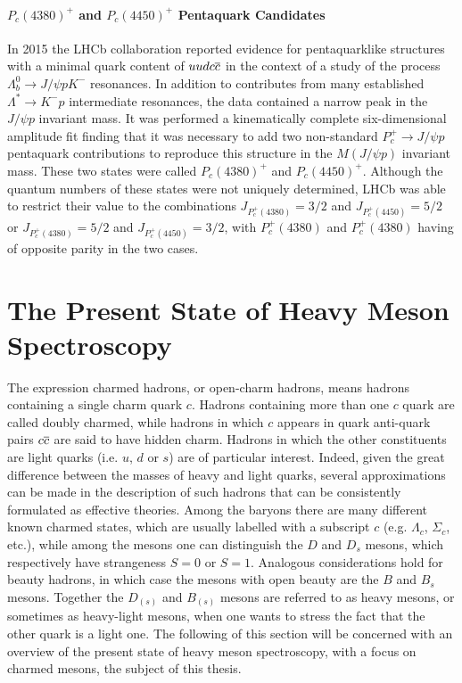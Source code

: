 \paragraph{$P_c(4380)^+$ and $P_c(4450)^+$ Pentaquark Candidates} In 2015 the LHCb collaboration reported evidence for pentaquarklike structures with a minimal quark content of $uudc\overline{c}$ in the context of a study of the process $\Lambda^0_b \to J/\psi p K^-$ resonances. In addition to contributes from many established $\Lambda^* \to K^- p$ intermediate resonances, the data contained a narrow peak in the $J/\psi p$ invariant mass. It was performed a kinematically complete six-dimensional amplitude fit finding that it was necessary to add two non-standard $P_c^+ \to J/\psi p$ pentaquark contributions to reproduce this structure in the $M(J/\psi p)$ invariant mass. These two states were called $P_c(4380)^+$ and $P_c(4450)^+$. Although the quantum numbers of these states were not uniquely determined, LHCb was able to restrict their value to the combinations $J_{P_c^+(4380)} = 3/2$ and $J_{P_c^+(4450)} = 5/2$ or $J_{P_c^+(4380)} = 5/2$ and $J_{P_c^+(4450)} = 3/2$, with $P_c^+(4380)$ and $P_c^+(4380)$ having of opposite parity in the two cases.

\section{The Present State of Heavy Meson Spectroscopy}

The expression charmed hadrons, or open-charm hadrons, means hadrons containing a single charm quark $c$. Hadrons containing more than one $c$ quark are called doubly charmed, while hadrons in which $c$ appears in quark anti-quark pairs $c \overline{c}$ are said to have hidden charm. Hadrons in which the other constituents are light quarks (i.e. $u$, $d$ or $s$) are of particular interest. Indeed, given the great difference between the masses of heavy and light quarks, several approximations can be made in the description of such hadrons that can be consistently formulated as effective theories. Among the baryons there are many different known charmed states, which are usually labelled with a subscript $c$ (e.g. $\Lambda_c$, $\Sigma_c$, etc.), while among the mesons one can distinguish the $D$ and $D_s$ mesons, which respectively have strangeness $S = 0$ or $S = 1$. Analogous considerations hold for beauty hadrons, in which case the mesons with open beauty are the $B$ and $B_s$ mesons. Together the $D_{(s)}$ and $B_{(s)}$ mesons are referred to as heavy mesons, or sometimes as heavy-light mesons, when one wants to stress the fact that the other quark is a light one. The following of this section will be concerned with an overview of the present state of heavy meson spectroscopy, with a focus on charmed mesons, the subject of this thesis.

